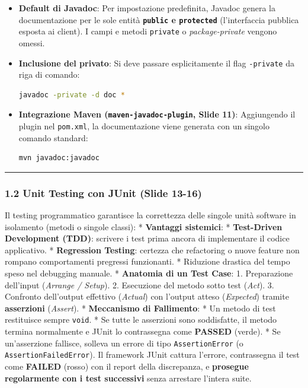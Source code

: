 \documentclass[11pt,a4paper]{article}
\newcommand{\passthrough}[1]{#1}
\begin{document}
\begin{itemize}
\item
  \textbf{Default di Javadoc}: Per impostazione predefinita, Javadoc
  genera la documentazione per le sole entità
  \textbf{\passthrough{\lstinline!public!} e
  \passthrough{\lstinline!protected!}} (l'interfaccia pubblica esposta
  ai client). I campi e metodi \passthrough{\lstinline!private!} o
  \emph{package-private} vengono omessi.
\item
  \textbf{Inclusione del privato}: Si deve passare esplicitamente il
  flag \passthrough{\lstinline!-private!} da riga di comando:

\begin{lstlisting}[language=bash]
javadoc -private -d doc *
\end{lstlisting}
\item
  \textbf{Integrazione Maven
  (\passthrough{\lstinline!maven-javadoc-plugin!}, Slide 11)}:
  Aggiungendo il plugin nel \passthrough{\lstinline!pom.xml!}, la
  documentazione viene generata con un singolo comando standard:

\begin{lstlisting}[language=bash]
mvn javadoc:javadoc
\end{lstlisting}
\end{itemize}

\begin{center}\rule{0.5\linewidth}{0.5pt}\end{center}

\subsubsection{1.2 Unit Testing con JUnit (Slide
13-16)}\label{unit-testing-con-junit-slide-13-16}

Il testing programmatico garantisce la correttezza delle singole unità
software in isolamento (metodi o singole classi): * \textbf{Vantaggi
sistemici}: * \textbf{Test-Driven Development (TDD)}: scrivere i test
prima ancora di implementare il codice applicativo. * \textbf{Regression
Testing}: certezza che refactoring o nuove feature non rompano
comportamenti pregressi funzionanti. * Riduzione drastica del tempo
speso nel debugging manuale. * \textbf{Anatomia di un Test Case}: 1.
Preparazione dell'input (\emph{Arrange / Setup}). 2. Esecuzione del
metodo sotto test (\emph{Act}). 3. Confronto dell'output effettivo
(\emph{Actual}) con l'output atteso (\emph{Expected}) tramite
\textbf{asserzioni} (\emph{Assert}). * \textbf{Meccanismo di
Fallimento}: * Un metodo di test restituisce sempre
\passthrough{\lstinline!void!}. * Se tutte le asserzioni sono
soddisfatte, il metodo termina normalmente e JUnit lo contrassegna come
\textbf{PASSED} (verde). * Se un'asserzione fallisce, solleva un errore
di tipo \passthrough{\lstinline!AssertionError!} (o
\passthrough{\lstinline!AssertionFailedError!}). Il framework JUnit
cattura l'errore, contrassegna il test come \textbf{FAILED} (rosso) con
il report della discrepanza, e \textbf{prosegue regolarmente con i test
successivi} senza arrestare l'intera suite.
\end{document}
